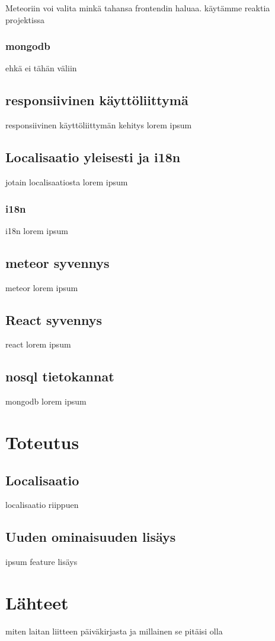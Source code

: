 \documentclass[11pt,a4paper,titlepage,oneside]{article}
\begin{document}
Meteoriin voi valita minkä tahansa frontendin haluaa. käytämme reaktia projektissa

\subsubsection{mongodb}
ehkä ei tähän väliin






\subsection{responsiivinen käyttöliittymä}
responsiivinen käyttöliittymän kehitys lorem ipsum






\subsection{Localisaatio yleisesti ja i18n}
jotain localisaatiosta lorem ipsum

\subsubsection{i18n}
i18n lorem ipsum





\subsection{meteor syvennys} 
meteor lorem ipsum


\subsection{React syvennys}
react lorem ipsum 




\subsection{nosql tietokannat}
mongodb lorem ipsum








\newpage
\section{Toteutus}              %


\subsection{Localisaatio}
localisaatio riippuen 


\subsection{Uuden ominaisuuden lisäys}
ipsum feature lisäys



\newpage
\section{Lähteet}               %

miten laitan liitteen päiväkirjasta ja millainen se pitäisi olla
\end{document}
